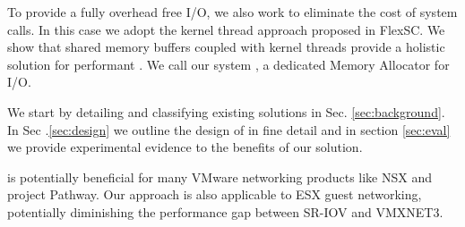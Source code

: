 To provide a fully overhead free I/O, we also work to eliminate the cost of system calls. In this case we adopt the kernel thread approach proposed in FlexSC\cite{flexsc}. We show that shared memory buffers coupled with kernel threads provide a holistic solution for performant \sockets.
We call our system \oursys, a dedicated Memory Allocator for I/O. 

We start by detailing and classifying existing solutions in Sec. \ref{sec:background}. In Sec .\ref{sec:design} we outline the design of \oursys in fine detail and in section \ref{sec:eval} we provide experimental evidence to the benefits of our solution. 

\smallskip
\oursys is potentially beneficial for many VMware networking products like NSX and project Pathway\cite{cbn,ktcp}. Our approach is also applicable to ESX guest networking, potentially diminishing the performance gap between SR-IOV and VMXNET3.